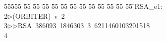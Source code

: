 %
%
\begin{tabbing}
55555 \= 55 \= 55 \= 55 \= 55 \= 55 \= 55 \= 55 \= 55 \= 55 \= 55 \= 55 \= 55 \= \>RSA\_e1:\\[0pt]
2\>$\triangleright$\>(ORBITER)\ v\ 2\ \\[0pt]
3\>$\triangleright$\>$\triangleright$\>RSA\ 386093\ 1846303\ 3\ 6211460103201518\\[0pt]
4\>\end{tabbing}
